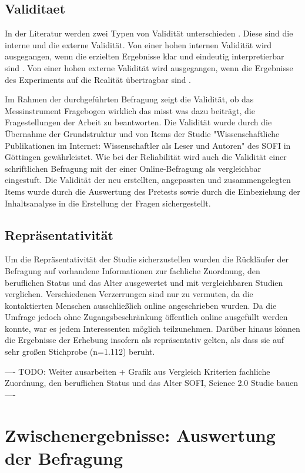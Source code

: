 \subsection{Validitaet}
In der Literatur werden zwei Typen von Validität unterschieden \cite{rost_2004_lehrbuch}. Diese sind die interne und die externe Validität. Von einer hohen internen Validität wird ausgegangen, wenn die erzielten Ergebnisse klar und eindeutig interpretierbar sind \cite{raab_2012_fragebogen}. Von einer hohen externe Validität wird ausgegangen, wenn die Ergebnisse des Experiments auf die Realität übertragbar sind \cite{bortz1995forschungsmethoden}.

Im Rahmen der durchgeführten Befragung zeigt die Validität, ob das Messinstrument Fragebogen wirklich das misst was dazu beiträgt, die Fragestellungen der Arbeit zu beantworten. Die Validität wurde durch die Übernahme der Grundstruktur und von Items der Studie "Wissenschaftliche Publikationen im Internet: Wissenschaftler als Leser und Autoren" des SOFI in Göttingen gewährleistet. Wie bei der Reliabilität wird auch die Validität einer schriftlichen Befragung mit der einer Online-Befragung als vergleichbar eingestuft. Die Validität der neu erstellten, angepassten  und zusammengelegten Items wurde durch die Auswertung des Pretests sowie durch die Einbeziehung der Inhaltsanalyse in die Erstellung der Fragen sichergestellt.

\subsection{Repräsentativität}

Um die Repräsentativität der Studie sicherzustellen wurden die Rückläufer der Befragung auf vorhandene Informationen zur fachliche Zuordnung, den beruflichen Status und das Alter ausgewertet und mit vergleichbaren Studien verglichen. Verschiedenen Verzerrungen sind nur zu vermuten, da die kontaktierten Menschen ausschließlich online angeschrieben wurden. Da die Umfrage jedoch ohne Zugangsbeschränkung öffentlich online ausgefüllt werden konnte, war es jedem Interessenten möglich teilzunehmen. Darüber hinaus können die Ergebnisse der Erhebung insofern als repräsentativ gelten, als dass sie auf sehr großen Stichprobe (n=1.112) beruht.

---- TODO: Weiter ausarbeiten + Grafik aus Vergleich Kriterien fachliche Zuordnung, den beruflichen Status und das Alter SOFI, Science 2.0 Studie bauen ----

\section{Zwischenergebnisse: Auswertung der Befragung}

